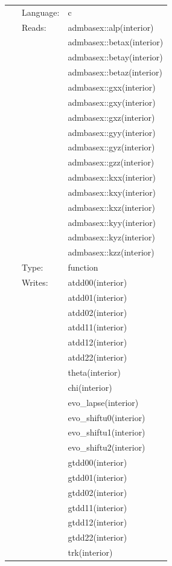  \begin{tabular*}{160mm}{cll} 
~ & Language:  & c \\ 
~ & Reads:  & admbasex::alp(interior) \\ 
~& ~ &admbasex::betax(interior)\\ 
~& ~ &admbasex::betay(interior)\\ 
~& ~ &admbasex::betaz(interior)\\ 
~& ~ &admbasex::gxx(interior)\\ 
~& ~ &admbasex::gxy(interior)\\ 
~& ~ &admbasex::gxz(interior)\\ 
~& ~ &admbasex::gyy(interior)\\ 
~& ~ &admbasex::gyz(interior)\\ 
~& ~ &admbasex::gzz(interior)\\ 
~& ~ &admbasex::kxx(interior)\\ 
~& ~ &admbasex::kxy(interior)\\ 
~& ~ &admbasex::kxz(interior)\\ 
~& ~ &admbasex::kyy(interior)\\ 
~& ~ &admbasex::kyz(interior)\\ 
~& ~ &admbasex::kzz(interior)\\ 
~ & Type:  & function \\ 
~ & Writes:  & atdd00(interior) \\ 
~& ~ &atdd01(interior)\\ 
~& ~ &atdd02(interior)\\ 
~& ~ &atdd11(interior)\\ 
~& ~ &atdd12(interior)\\ 
~& ~ &atdd22(interior)\\ 
~& ~ &theta(interior)\\ 
~& ~ &chi(interior)\\ 
~& ~ &evo\_lapse(interior)\\ 
~& ~ &evo\_shiftu0(interior)\\ 
~& ~ &evo\_shiftu1(interior)\\ 
~& ~ &evo\_shiftu2(interior)\\ 
~& ~ &gtdd00(interior)\\ 
~& ~ &gtdd01(interior)\\ 
~& ~ &gtdd02(interior)\\ 
~& ~ &gtdd11(interior)\\ 
~& ~ &gtdd12(interior)\\ 
~& ~ &gtdd22(interior)\\ 
~& ~ &trk(interior)\\ 
\end{tabular*} 


